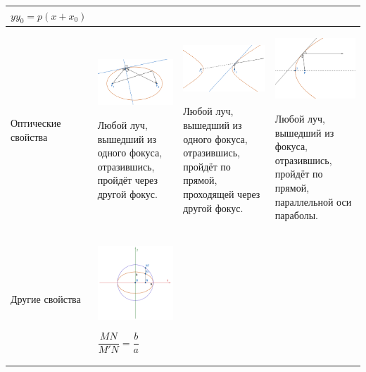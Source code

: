 \documentclass[twoside]{book}
\begin{document}
\begin{center}
\begin{longtable}{|p{2.5cm}|p{4.5cm}|p{4.5cm}|p{4.5cm}|}
        \(y y_0 = p(x + x_0)\)
        \\
        \hline
        Оптические свойства
         &
        \begin{center}
            \includegraphics[width=4.5cm]{Images/Chapter_1/3-1-16.png}
        \end{center}
        Любой луч, вышедший из одного фокуса, отразившись, пройдёт через другой фокус.
         &
        \begin{center}
            \includegraphics[width=4.5cm]{Images/Chapter_1/3-1-17.png}
        \end{center}
        Любой луч, вышедший из одного фокуса, отразившись, пройдёт по прямой, проходящей через другой фокус.
         &
        \begin{center}
            \includegraphics[width=4.5cm]{Images/Chapter_1/3-1-18.png}
        \end{center}
        Любой луч, вышедший из фокуса, отразившись, пройдёт по прямой, параллельной оси параболы.
        \\
        \hline
        Другие свойства
         &
        \begin{center}
            \includegraphics[width=4.5cm]{Images/Chapter_1/3-1-19.png}
        \end{center}
        \(\dfrac{MN}{M'N} = \dfrac{b}{a}\)


\end{longtable}
\end{center}
\end{document}
